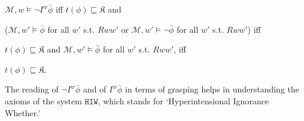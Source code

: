 \documentclass{article}
\begin{document}
\begin{center}

$\mathcal{M}, w \models \neg I^{w} \bar{\phi}$ iff $t(\phi) \sqsubseteq \mathfrak{K}$ and 

($\mathcal{M}, w' \models \bar{\phi}$ for all $w'$ s.t. $Rww'$ or $\mathcal{M}, w' \models \neg \bar{\phi}$ for all $w'$ s.t. $Rww'$) iff

$t(\phi) \sqsubseteq \mathfrak{K}$ and $\mathcal{M}, w' \models \bar{\phi}$ for all $w'$ s.t. $Rww'$, iff

$t(\phi) \sqsubseteq \mathfrak{K}$.

\end{center}

The reading of $\neg I^{w} \bar{\phi}$ and of $I^{w} \bar{\phi}$ in terms of grasping helps in understanding the axioms of the system $\mathtt{HIW}$, which stands for `Hyperintensional Ignorance Whether.'
\end{document}
